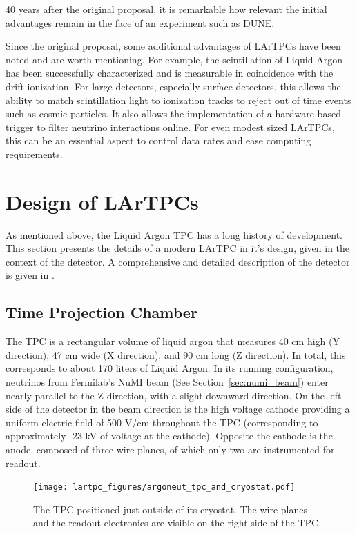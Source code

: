 40 years after the original proposal, it is remarkable how relevant the initial advantages remain in the face of an experiment such as DUNE. 

Since the original proposal, some additional advantages of LArTPCs have been noted and are worth mentioning.  For example, the scintillation of Liquid Argon has been successfully characterized \cite{Heindl:2010zz} and is measurable in coincidence with the drift ionization.  For large detectors, especially surface detectors, this allows the ability to match scintillation light to ionization tracks to reject out of time events such as cosmic particles.  It also allows the implementation of a hardware based trigger to filter neutrino interactions online.  For even modest sized LArTPCs, this can be an essential aspect to control data rates and ease computing requirements.

\section{Design of LArTPCs}
\label{sec:argoneut_detector}

As mentioned above, the Liquid Argon TPC has a long history of development.  This section presents the details of a modern LArTPC in it's design, given in the context of the \argoneut detector. A comprehensive and detailed description of the \argoneut detector is given in \cite{Anderson:2012vc}.

\subsection{\argoneut Time Projection Chamber}

The \argoneut TPC is a rectangular volume of liquid argon that measures 40 cm high (Y direction), 47 cm wide (X direction), and 90 cm long (Z direction).  In total, this corresponds to about 170 liters of Liquid Argon.  In its running configuration, neutrinos from Fermilab's NuMI beam (See Section~\ref{sec:numi_beam}) enter nearly parallel to the Z direction, with a slight downward direction.  On the left side of the detector in the beam direction is the high voltage cathode providing a uniform electric field of 500 V/cm throughout the TPC (corresponding to approximately -23 kV of voltage at the cathode).  Opposite the cathode is the anode, composed of three wire planes, of which only two are instrumented for readout.

\begin{figure}[htbp]
  \centering
  \texttt{[image: lartpc\_figures/argoneut\_tpc\_and\_cryostat.pdf]}
  \caption[The \argoneut TPC]{The \argoneut TPC positioned just outside of its cryostat.  The wire planes and the readout electronics are visible on the right side of the TPC.}
  \label{fig:argoneut_tpc}
\end{figure}

